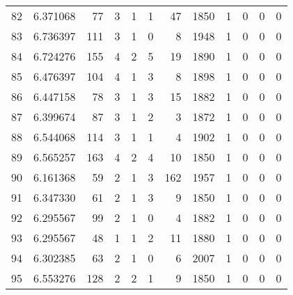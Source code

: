 \begin{tabular}{lrrrrrrrrrrr}
82  &  6.371068 &   77 &      3 &        1 &      1 &              47 &  1850 &               1 &               0 &               0 &               0 \\
83  &  6.736397 &  111 &      3 &        1 &      0 &               8 &  1948 &               1 &               0 &               0 &               0 \\
84  &  6.724276 &  155 &      4 &        2 &      5 &              19 &  1890 &               1 &               0 &               0 &               0 \\
85  &  6.476397 &  104 &      4 &        1 &      3 &               8 &  1898 &               1 &               0 &               0 &               0 \\
86  &  6.447158 &   78 &      3 &        1 &      3 &              15 &  1882 &               1 &               0 &               0 &               0 \\
87  &  6.399674 &   87 &      3 &        1 &      2 &               3 &  1872 &               1 &               0 &               0 &               0 \\
88  &  6.544068 &  114 &      3 &        1 &      1 &               4 &  1902 &               1 &               0 &               0 &               0 \\
89  &  6.565257 &  163 &      4 &        2 &      4 &              10 &  1850 &               1 &               0 &               0 &               0 \\
90  &  6.161368 &   59 &      2 &        1 &      3 &             162 &  1957 &               1 &               0 &               0 &               0 \\
91  &  6.347330 &   61 &      2 &        1 &      3 &               9 &  1850 &               1 &               0 &               0 &               0 \\
92  &  6.295567 &   99 &      2 &        1 &      0 &               4 &  1882 &               1 &               0 &               0 &               0 \\
93  &  6.295567 &   48 &      1 &        1 &      2 &              11 &  1880 &               1 &               0 &               0 &               0 \\
94  &  6.302385 &   63 &      2 &        1 &      0 &               6 &  2007 &               1 &               0 &               0 &               0 \\
95  &  6.553276 &  128 &      2 &        2 &      1 &               9 &  1850 &               1 &               0 &               0 &               0 \\

\end{tabular}
